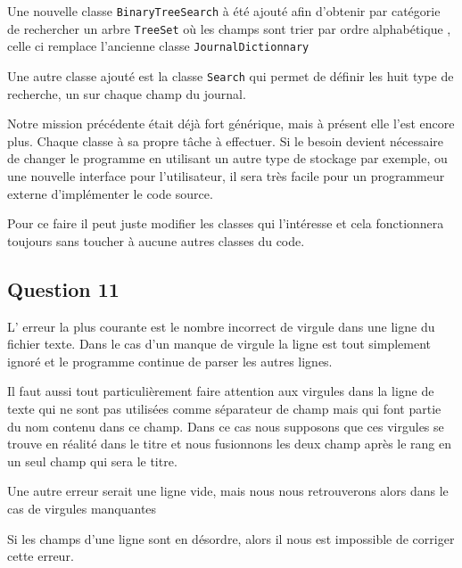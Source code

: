 \documentclass[11pt]{article}
\begin{document}
Une nouvelle classe \verb+BinaryTreeSearch+ à été ajouté afin d'obtenir par catégorie de rechercher un arbre \verb+TreeSet+ où les champs sont trier par ordre alphabétique , celle ci remplace l'ancienne classe \verb+JournalDictionnary+

Une autre classe ajouté est la classe \verb+Search+ qui permet de définir les huit type de recherche, un sur chaque champ du journal.

Notre mission précédente était déjà fort générique, mais à présent elle l'est encore plus. Chaque classe à sa propre tâche à effectuer. Si le besoin devient nécessaire de changer le programme en utilisant un autre type de stockage par exemple, ou une nouvelle interface pour l'utilisateur, il sera très facile pour un programmeur externe d'implémenter le code source.

Pour ce faire il peut juste modifier les classes qui l'intéresse et cela fonctionnera toujours sans toucher à aucune autres classes du code.

\subsection*{Question 11}

L' erreur la plus courante est le nombre incorrect de virgule dans une ligne du fichier texte. Dans le cas d'un manque de virgule la ligne est tout simplement ignoré et le programme continue de parser les autres lignes.

Il faut aussi tout particulièrement faire attention aux virgules dans la ligne de texte qui ne sont pas utilisées comme séparateur de champ mais qui font partie du nom contenu dans ce champ.
Dans ce cas nous supposons que ces virgules se trouve en réalité dans le titre et nous fusionnons les deux champ après le rang en un seul champ qui sera le titre.

Une autre erreur serait une ligne vide, mais nous nous retrouverons alors dans le cas de virgules manquantes

Si les champs d'une ligne sont en désordre, alors il nous est impossible de corriger cette erreur.
\end{document}
